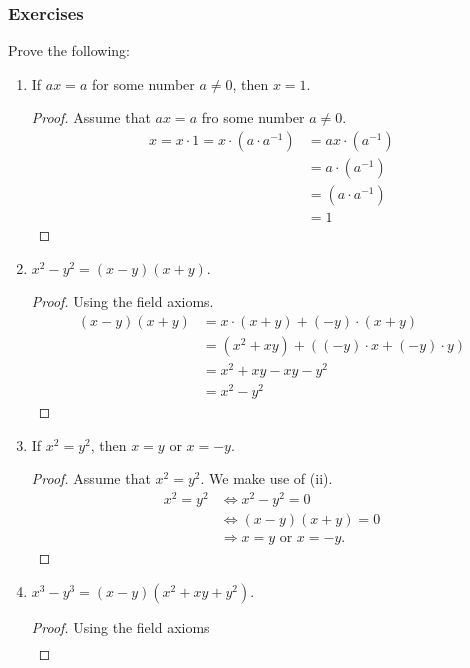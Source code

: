 \subsubsection{Exercises}
\begin{exercise}[\textbf{1}]
     Prove the following:
    \begin{enumerate}
        \item If $ax=a$ for some number $a \neq 0$, then $x=1$.
        \begin{proof}
            Assume that $ax=a$ fro some number $a\neq 0$. 
            \begin{align*}
                x = x\cdot 1 = x\cdot (a\cdot a^{-1}) &= ax \cdot (a^{-1}) \\
                &= a \cdot (a^{-1}) \\
                &= (a\cdot a^{-1}) \\   
                &= 1
            \end{align*}
        \end{proof}
        \item $x^2-y^2 = (x-y)(x+y)$.
        \begin{proof} Using the field axioms.
             \begin{align*}
                 (x-y)(x+y) &= x\cdot (x+y) + (-y)\cdot (x+y) \\
                 &= (x^2+xy)+((-y)\cdot x+(-y)\cdot y) \\
                 &= x^2+xy-xy-y^2 \\
                 &= x^2-y^2
             \end{align*}
        \end{proof}
        \item If $x^2=y^2$, then $x=y$ or $x=-y$.
        \begin{proof}Assume that $x^2=y^2$. We make use of (ii).
             \begin{align*}
                 x^2 = y^2 &\Leftrightarrow  x^2-y^2 = 0 \\
                 & \Leftrightarrow (x-y)(x+y) =0 \\
                 & \Rightarrow x=y \text{ or } x=-y.
             \end{align*}
        \end{proof}
        \item $x^3-y^3=(x-y)(x^2+xy+y^2)$.
        \begin{proof}
             Using the field axioms
             \begin{align*}

\end{align*}
\end{proof}
\end{enumerate}
\end{exercise}
